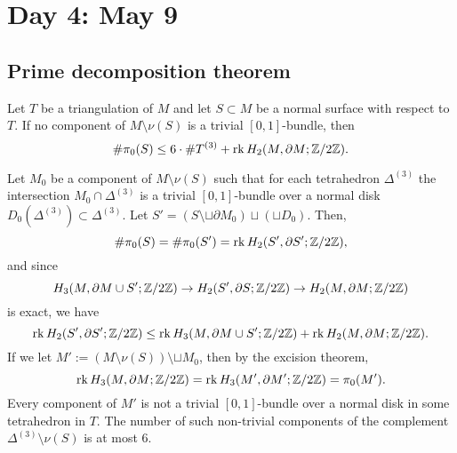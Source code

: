 \documentclass{../../small}
\begin{document}
\newpage
\section{Day 4: May 9}
\setcounter{section}{3}
\setcounter{subsection}{3}
\setcounter{thm}{7}

\subsection{Prime decomposition theorem}
\begin{prop}
Let $T$ be a triangulation of $M$ and let $S\subset M$ be a normal surface with respect to $T$.
If no component of $M\setminus\nu(S)$ is a trivial $[0,1]$-bundle, then
\[\#\pi_0(S)\le6\cdot\#T^{(3)}+\operatorname{rk} H_2(M,\partial M;\mathbb{Z}/2\mathbb{Z}).\]
\end{prop}
\begin{pf}
Let $M_0$ be a component of $M\setminus\nu(S)$ such that for each tetrahedron $\Delta^{(3)}$ the intersection $M_0\cap\Delta^{(3)}$ is a trivial $[0,1]$-bundle over a normal disk $D_0(\Delta^{(3)})\subset\Delta^{(3)}$.
Let $S'=(S\setminus\sqcup\partial M_0)\sqcup(\sqcup D_0)$.
Then,
\[\#\pi_0(S)=\#\pi_0(S')=\operatorname{rk} H_2(S',\partial S';\mathbb{Z}/2\mathbb{Z}),\]
and since
\[H_3(M,\partial M\cup S';\mathbb{Z}/2\mathbb{Z})\to H_2(S',\partial S;\mathbb{Z}/2\mathbb{Z})\to H_2(M,\partial M;\mathbb{Z}/2\mathbb{Z})\]
is exact, we have
\[\operatorname{rk} H_2(S',\partial S';\mathbb{Z}/2\mathbb{Z})\le\operatorname{rk} H_3(M,\partial M\cup S';\mathbb{Z}/2\mathbb{Z})+\operatorname{rk} H_2(M,\partial M;\mathbb{Z}/2\mathbb{Z}).\]
If we let $M':=(M\setminus\nu(S))\setminus\sqcup M_0$, then by the excision theorem,
\[\operatorname{rk} H_3(M,\partial M;\mathbb{Z}/2\mathbb{Z})=\operatorname{rk} H_3(M',\partial M';\mathbb{Z}/2\mathbb{Z})=\pi_0(M').\]
Every component of $M'$ is not a trivial $[0,1]$-bundle over a normal disk in some tetrahedron in $T$.
The number of such non-trivial components of the complement $\Delta^{(3)}\setminus\nu(S)$ is at most 6.
\end{pf}
\end{document}
